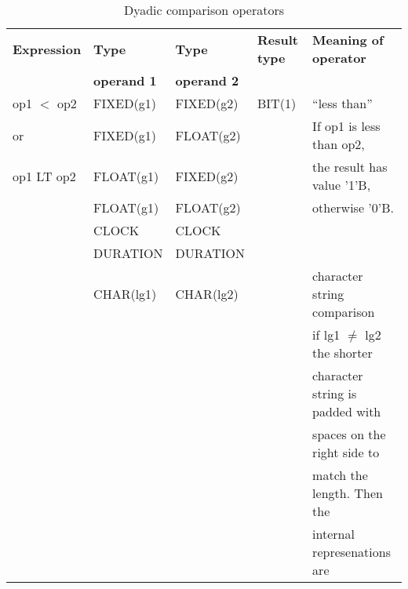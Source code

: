 \begin{table} %
\begin{center}
\caption{Dyadic comparison operators}
\label{tab_dyadic_compare}
\vspace{5mm}
\begin{tabular}{|l|l|l|l|l|}
\hline
{\bf Expression} & {\bf Type}      & {\bf Type}      & {\bf Result type} & {\bf Meaning of operator}\\
                 & {\bf operand 1} & {\bf operand 2} &                   & \\ \hline

op1 $<$ op2      & FIXED(g1)       & FIXED(g2)       &   BIT(1)             & ``less than''\\
or               & FIXED(g1)       & FLOAT(g2)       &                      & If op1 is less than op2,\\
op1 LT op2       & FLOAT(g1)       & FIXED(g2)       &                      & the result has value '1'B,\\
                 & FLOAT(g1)       & FLOAT(g2)       &                      & otherwise '0'B.\\
                 & CLOCK           & CLOCK           &                      & \\
                 & DURATION        & DURATION        &                      & \\ \cline{2-3} \cline{5-5}
                 & CHAR(lg1)       & CHAR(lg2)       &                      & character string comparison\\
                 &                 &                 &                      & if lg1 $\neq$ lg2 the shorter  \\ 
                 &                 &                 &                      & character string is padded with\\
                 &                 &                 &                      & spaces on the right side to    \\
                 &                 &                 &                      & match the length. Then the    \\
                 &                 &                 &                      & internal represenations are \\ 

\end{tabular}
\end{center}
\end{table}
